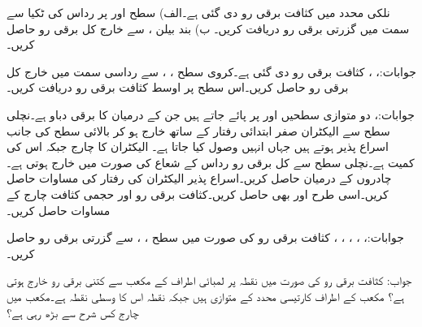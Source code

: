 نلکی محدد میں کثافت برقی رو  دی گئی ہے۔الف) سطح  اور  پر رداس  کی ٹکیا سے  سمت میں گزرتی برقی رو دریافت کریں۔ ب) بند بیلن ،  سے خارج کل برقی رو حاصل کریں۔

جوابات:، ، 
کثافت برقی رو  دی گئی ہے۔کروی سطح ، ،  سے رداسی سمت میں خارج کل برقی رو حاصل کریں۔اس سطح پر اوسط کثافت برقی رو دریافت کریں۔

جوابات:، 
دو متوازی سطحیں  اور  پر پائے جاتے ہیں جن کے درمیان  کا برقی دباو ہے۔نچلی سطح سے الیکٹران صفر ابتدائی رفتار کے ساتھ خارج ہو کر بالائی سطح کی جانب اسراع پذیر ہوتے ہیں جہاں انہیں وصول کیا جاتا ہے۔ الیکٹران کا چارج  جبکہ اس کی کمیت  ہے۔نچلی سطح سے کل  برقی رو  رداس کے شعاع کی صورت میں خارج ہوتی ہے۔چادروں کے درمیان  حاصل کریں۔اسراع پذیر الیکٹران کی رفتار  کی مساوات حاصل کریں۔اسی طرح  اور  بھی حاصل کریں۔کثافت برقی رو اور حجمی کثافت چارج کے مساوات حاصل کریں۔

جوابات:، ، ، ، ،  
کثافت برقی رو  کی صورت میں سطح ،  ، سے گزرتی برقی رو حاصل کریں۔

جواب:
کثافت برقی رو  کی صورت میں نقطہ  پر  لمبائی اطراف کے مکعب سے کتنی برقی رو خارج ہوتی ہے؟ مکعب کے اطراف کارتیسی محدد کے متوازی ہیں جبکہ نقطہ  اس کا وسطی نقطہ ہے۔مکعب میں چارج کس شرح سے بڑھ رہی ہے؟

